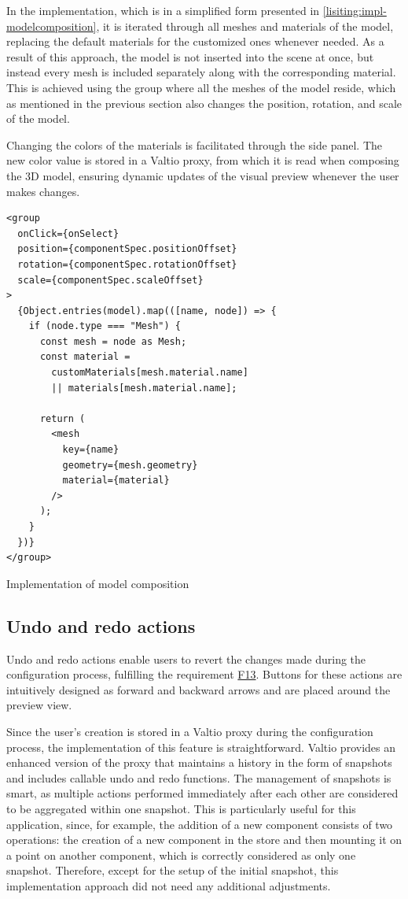 In the implementation, which is in a simplified form presented in \autoref{lisiting:impl-modelcomposition}, it is iterated through all meshes and materials of the model, replacing the default materials for the customized ones whenever needed. As a result of this approach, the model is not inserted into the scene at once, but instead every mesh is included separately along with the corresponding material. This is achieved using the group where all the meshes of the model reside, which as mentioned in the previous section also changes the position, rotation, and scale of the model.

Changing the colors of the materials is facilitated through the side panel. The new color value is stored in a Valtio proxy, from which it is read when composing the 3D model, ensuring dynamic updates of the visual preview whenever the user makes changes.

\begin{listing}[h!]
\begin{verbatim}
<group
  onClick={onSelect}
  position={componentSpec.positionOffset}
  rotation={componentSpec.rotationOffset}
  scale={componentSpec.scaleOffset}
>
  {Object.entries(model).map(([name, node]) => {
    if (node.type === "Mesh") {
      const mesh = node as Mesh;
      const material =
        customMaterials[mesh.material.name] 
        || materials[mesh.material.name];

      return (
        <mesh
          key={name}
          geometry={mesh.geometry}
          material={material}
        />
      );
    }
  })}
</group>
\end{verbatim}
\caption{Implementation of model composition}
\label{lisiting:impl-modelcomposition}
\end{listing}

\subsection{Undo and redo actions}

Undo and redo actions enable users to revert the changes made during the configuration process, fulfilling the requirement \hyperref[itm:F13]{F13}. Buttons for these actions are intuitively designed as forward and backward arrows and are placed around the preview view.

Since the user's creation is stored in a Valtio proxy during the configuration process, the implementation of this feature is straightforward. Valtio provides an enhanced version of the proxy that maintains a history in the form of snapshots and includes callable undo and redo functions. The management of snapshots is smart, as multiple actions performed immediately after each other are considered to be aggregated within one snapshot. This is particularly useful for this application, since, for example, the addition of a new component consists of two operations: the creation of a new component in the store and then mounting it on a point on another component, which is correctly considered as only one snapshot. Therefore, except for the setup of the initial snapshot, this implementation approach did not need any additional adjustments.

